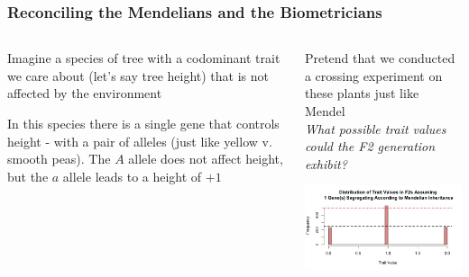 \documentclass{beamer}
\begin{document}


\begin{frame}
\frametitle{Reconciling the Mendelians and the Biometricians}

\begin{columns}
	\begin{column}{0.4\textwidth}
\small	Imagine a species of tree with a codominant trait we care about (let's say tree height) that is not affected by the environment\\\pause

\bigskip

\small In this species there is a single gene that controls height - with a pair of alleles (just like yellow v. smooth peas). The $A$ allele does not affect height, but the $a$ allele leads to a height of $+1$ \\ \pause

\bigskip



\end{column}
\begin{column}{0.6\textwidth}
Pretend that we conducted a crossing experiment on these plants just like Mendel\\
 \textit{What possible trait values could the F2 generation exhibit?} \\
\pause
\bigskip

\includegraphics[keepaspectratio, width = \textwidth]{img/oneGene} \\  
\end{column}
\end{columns}	



\end{frame}
\end{document}
